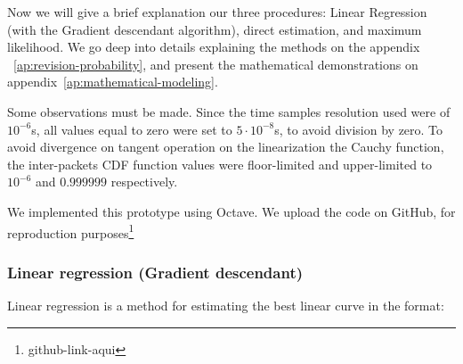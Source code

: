 




Now we will give a brief explanation our three procedures: Linear Regression (with the  Gradient descendant algorithm), direct estimation, and maximum likelihood. We go deep into details explaining the methods on the appendix ~\ref{ap:revision-probability}, and present the mathematical demonstrations on appendix~\ref{ap:mathematical-modeling}. 

Some observations must be made. Since the time samples resolution used were of $10^{-6}$s, all values equal to zero were set to  $5\cdot10^{-8}$s, to avoid division by zero. To avoid divergence on tangent operation on the linearization the Cauchy function, the inter-packets CDF function values were floor-limited and upper-limited to  $10^{-6}$ and $0.999999$ respectively.

We implemented this prototype using Octave. We upload the code on GitHub, for reproduction purposes\footnote{github-link-aqui}

\subsubsection{Linear regression (Gradient descendant)}

Linear regression is a method for estimating the best linear curve in the format:

